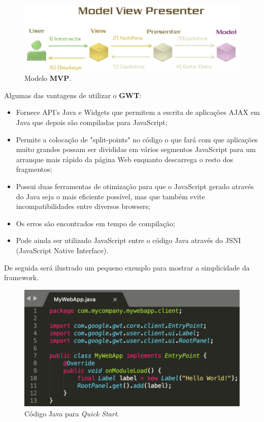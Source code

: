 \begin{figure}[H]
    \centering
    \includegraphics[scale=0.75]{images/MVP.png}
    \caption{Modelo \textbf{MVP}.}
    \label{fig:MVP}
\end{figure}

\hspace{5mm} Algumas das vantagens de utilizar o \textbf{GWT}:
\begin{itemize}
    \item Fornece API's Java e Widgets que permitem a escrita de aplicações AJAX em Java que depois são compiladas para JavaScript;
    \item Permite a colocação de "split-points" no código o que fará com que aplicações muito grandes possam ser divididas em vários segmentos JavaScript para um arranque mais rápido da página Web enquanto descarrega o resto dos fragmentos;
    \item Possui duas ferramentas de otimização para que o JavaScript gerado através do Java seja o mais eficiente possível, mas que também evite incompatibilidades entre diversos browsers;
    \item Os erros são encontrados em tempo de compilação;
    \item Pode ainda ser utilizado JavaScript entre o código Java através do JSNI (JavaScript Native Interface).
\end{itemize}

\hspace{5mm} De seguida será ilustrado um pequeno exemplo para mostrar a simplicidade da framework.

\begin{figure}[H]
    \centering
    \includegraphics[scale=0.7]{images/gwt-1.png}
    \caption{Código Java para \emph{Quick Start}.}
    \label{fig:gwt-1}
\end{figure}

